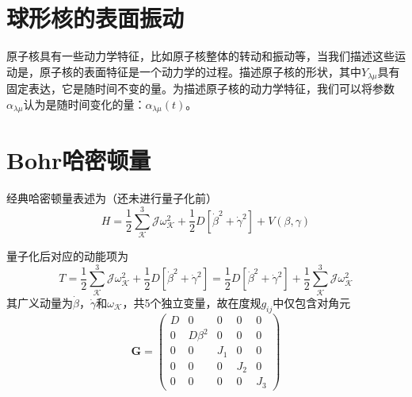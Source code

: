 \section{球形核的表面振动}
原子核具有一些动力学特征，比如原子核整体的转动和振动等，当我们描述这些运动是，原子核的表面特征是一个动力学的过程。描述原子核的形状，其中$Y_{\lambda\mu}$具有固定表达，它是随时间不变的量。为描述原子核的动力学特征，我们可以将参数$\alpha_{\lambda\mu}$认为是随时间变化的量：$\alpha_{\lambda\mu}(t)$\citep[Sect. 1.4]{Peter2004}。

\section{Bohr哈密顿量}
经典哈密顿量表述为（还未进行量子化前）
\begin{equation}
    H = \frac{1}{2} \sum_{\mathcal{K}}^{3} \mathcal{J}\omega_{\mathcal{K}}^2 + \frac{1}{2} D \left[\dot{\beta}^2 + \dot{\gamma}^2 \right] + V(\beta, \gamma)
	\label{eq:class-bohr-hamiltonian}
\end{equation}

量子化后对应的动能项为
\begin{equation}
	T = \frac{1}{2} \sum_{\mathcal{K}}^{3} \mathcal{J}\omega_{\mathcal{K}}^2 + \frac{1}{2} D \left[\dot{\beta}^2 + \dot{\gamma}^2 \right]
	= \frac{1}{2} D \left[\dot{\beta}^2 + \dot{\gamma}^2 \right] + \frac{1}{2} \sum_{\mathcal{K}}^{3} \mathcal{J}\omega_{\mathcal{K}}^2
\end{equation}
其广义动量为$\dot{\beta}$，$\dot{\gamma}$和$\omega_{\mathcal{K}}$，共5个独立变量，故在度规$g_{ij}$中仅包含对角元
\begin{equation}
    \bm{G} = \begin{pmatrix}
		D & 0        & 0     & 0     & 0 \\
		0 & D\beta^2 & 0     & 0     & 0 \\
		0 & 0        & J_{1} & 0     & 0 \\
		0 & 0        & 0     & J_{2} & 0 \\
		0 & 0        & 0     & 0     & J_{3}
	\end{pmatrix}
\end{equation}

